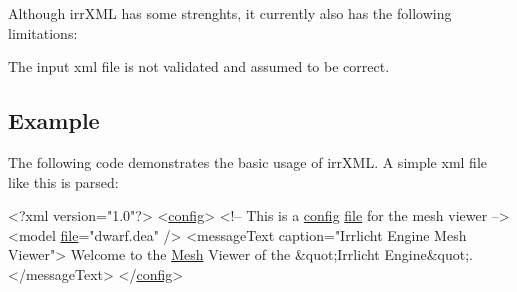 Although irr\+X\+M\+L has some strenghts, it currently also has the following limitations\+:


\begin{DoxyItemize}
\item The input xml file is not validated and assumed to be correct.
\end{DoxyItemize}\hypertarget{irrXML.h_irrxmlexample}{}\subsection{Example}\label{irrXML.h_irrxmlexample}
The following code demonstrates the basic usage of irr\+X\+M\+L. A simple xml file like this is parsed\+: 
\begin{DoxyCode}
<?xml version=\textcolor{stringliteral}{"1.0"}?>
<\hyperlink{structconfig__s}{config}>
 <!-- This is a \hyperlink{structconfig__s}{config} \hyperlink{structfile}{file} \textcolor{keywordflow}{for} the mesh viewer -->
 <model \hyperlink{structfile}{file}=\textcolor{stringliteral}{"dwarf.dea"} />
 <messageText caption=\textcolor{stringliteral}{"Irrlicht Engine Mesh Viewer"}>
 Welcome to the \hyperlink{class_mesh}{Mesh} Viewer of the &quot;Irrlicht Engine&quot;.
 </messageText>
</\hyperlink{structconfig__s}{config}>
\end{DoxyCode}


